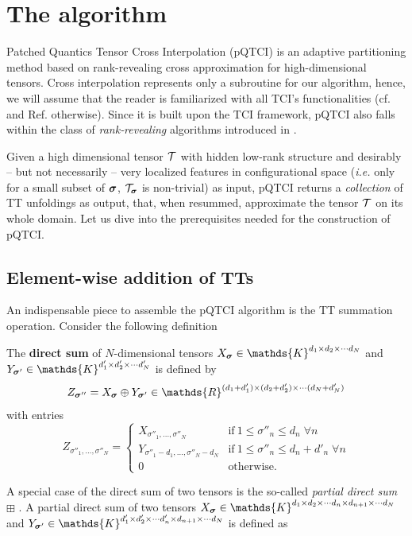 \section{The algorithm}
\label{sec:patchAlg}

Patched Quantics Tensor Cross Interpolation (pQTCI) is an adaptive partitioning method \cite{Deng2008} based on rank-revealing cross approximation for high-dimensional tensors. Cross interpolation represents only a subroutine for our algorithm, hence, we will assume that the reader is familiarized with all TCI's functionalities (cf.  and Ref. \cite{Fernandez2024} otherwise). Since it is built upon the TCI framework, pQTCI also falls within the class of \emph{rank‑revealing} algorithms introduced in .

Given a high dimensional tensor $\mathcal{T}$ with hidden low-rank structure and desirably -- but not necessarily -- very localized features in configurational space (\textit{i.e.} only for a small subset of $\boldsymbol{\sigma}$, $\mathcal{T}_{\boldsymbol{\sigma}}$ is non-trivial) as input, pQTCI returns a \textit{collection} of TT unfoldings as output, that, when resummed, approximate the tensor $\mathcal{T}$ on its whole domain. Let us dive into the prerequisites needed for the construction of pQTCI.


\subsection{Element-wise addition of TTs}
An indispensable piece to assemble the pQTCI algorithm is the TT summation operation. Consider the following definition
\begin{definition}
	The {\normalfont \textbf{direct sum}} of $N$-dimensional tensors $X_{\bsigma} \in \mathds{K}^{d_1 \times d_2 \times \cdots d_N}$ and $Y_{\bsigma'} \in \mathds{K}^{d'_1 \times d'_2 \times \cdots d'_N}$ is defined by 
	\begin{equation}
		Z_{\bsigma''} = X_{\bsigma} \oplus Y_{\bsigma'} \in \mathds{R}^{(d_1+d'_1) \times (d_2+d'_2) \times \cdots (d_N+d'_N)}
	\end{equation}
	with entries
	\begin{equation}
		Z_{\sigma''_1, \dots, \sigma''_N} = \begin{cases}
			X_{\sigma''_1, \dots, \sigma''_N} & \text{if}\ 1\leq \sigma''_n \leq d_n \;\forall n\\
			Y_{\sigma''_1-d_1, \dots, \sigma''_N-d_N} & \text{if}\ 1\leq \sigma''_n \leq d_n + d'_n \;\forall n\\
			0 & \text{otherwise}.
		\end{cases}
	\end{equation}
\end{definition}
A special case of the direct sum of two tensors is the so-called \textit{partial direct sum} $\boxplus$ \cite{Lee2018}. A partial direct sum of two tensors $X_{\bsigma} \in \mathds{K}^{d_1 \times d_2 \times \cdots d_n \times d_{n+1} \times \cdots d_N}$ and $Y_{\bsigma'} \in \mathds{K}^{d'_1 \times d'_2 \times \cdots d'_n \times d_{n+1} \times \cdots d_N}$ is defined as 

